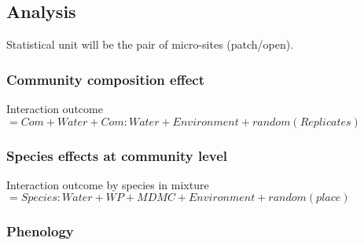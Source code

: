 \documentclass[12pt]{article} %
\begin{document}
\subsection{Analysis}

Statistical unit will be the pair of micro-sites (patch/open).


\subsubsection{Community composition effect}

Interaction outcome $= Com + Water + Com:Water + Environment + random(Replicates) $
\subsubsection{Species effects at community level}
Interaction outcome by species in mixture$ = Species:Water + WP + MDMC + Environment + random(place)$

\subsubsection{Phenology}




\begin{spacing}{1.0}

\end{spacing}
\end{document}
